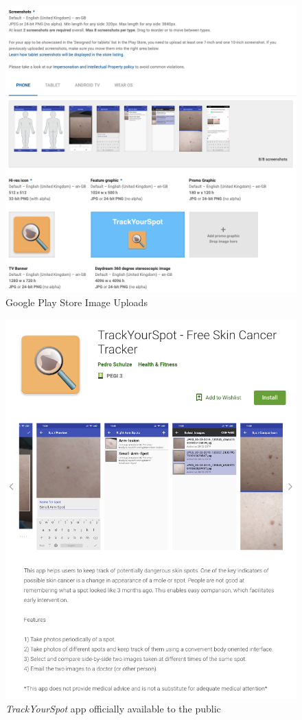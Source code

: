 \begin{figure}
    \includegraphics[width=1\textwidth, center]{figures/appscreenshots.png}
    \caption{Google Play Store Image Uploads}
    \label{fig:appscreenshots}
\end{figure}

\begin{figure}
    \includegraphics[width=1\textwidth, center]{figures/applisting.png}
    \caption{\emph{TrackYourSpot} app officially available to the public}
    \label{fig:applisting}
\end{figure}

